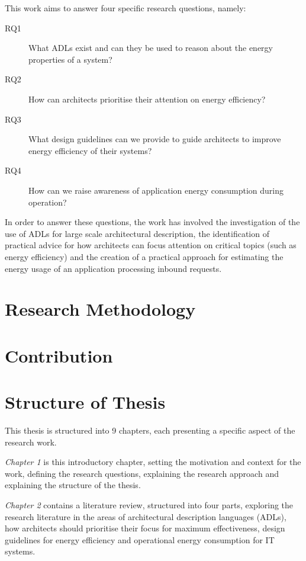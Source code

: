 This work aims to answer four specific research questions, namely:

\begin{description}
\item [RQ1] What ADLs exist and can they be used to reason about the energy properties of a system?
\item [RQ2] How can architects prioritise their attention on energy efficiency?
\item [RQ3] What design guidelines can we provide to guide architects to improve energy efficiency of their systems?
\item [RQ4] How can we raise awareness of application energy consumption during operation?
\end{description}

In order to answer these questions, the work has involved the investigation of the use of ADLs for large scale architectural description, the identification of practical advice for how architects can focus attention on critical topics (such as energy efficiency) and the creation of a practical approach for estimating the energy usage of an application processing inbound requests.

\section{Research Methodology}

\section{Contribution}

\section{Structure of Thesis}

This thesis is structured into 9 chapters, each presenting a specific aspect of the research work.

\emph{Chapter 1} is this introductory chapter, setting the motivation and context for the work, defining the research questions, explaining the research approach and explaining the structure of the thesis.

\emph{Chapter 2} contains a literature review, structured into four parts, exploring the research literature in the areas of architectural description languages (ADLs), how architects should prioritise their focus for maximum effectiveness, design guidelines for energy efficiency and operational energy consumption for IT systems.


